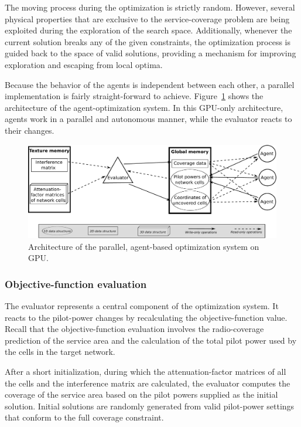 The moving process during the optimization is strictly random. However,
several physical properties that are exclusive to the service-coverage
problem are being exploited during the exploration of the search space.
Additionally, whenever the current solution breaks any of the given
constraints, the optimization process is guided back to the space
of valid solutions, providing a mechanism for improving exploration
and escaping from local optima.

Because the behavior of the agents is independent between each other,
a parallel implementation is fairly straight-forward to achieve. Figure~\ref{fig:06-Architecture_of_the_system_on_GPU}
shows the architecture of the agent-optimization system. In this GPU-only
architecture, agents work in a parallel and autonomous manner, while
the evaluator reacts to their changes.

\begin{figure}
\centering

\includegraphics[width=1\textwidth]{06-experimental_evaluation-service_coverage/img/architecture}

\caption{Architecture of the parallel, agent-based optimization system on GPU.\emph{\label{fig:06-Architecture_of_the_system_on_GPU}}}
\end{figure}



\subsubsection{Objective-function evaluation}

The evaluator represents a central component of the optimization system.
It reacts to the pilot-power changes by recalculating the objective-function
value. Recall that the objective-function evaluation involves the
radio-coverage prediction of the service area and the calculation
of the total pilot power used by the cells in the target network.

After a short initialization, during which the attenuation-factor
matrices of all the cells and the interference matrix are calculated,
the evaluator computes the coverage of the service area based on the
pilot powers supplied as the initial solution. Initial solutions are
randomly generated from valid pilot-power settings that conform to
the full coverage constraint.


